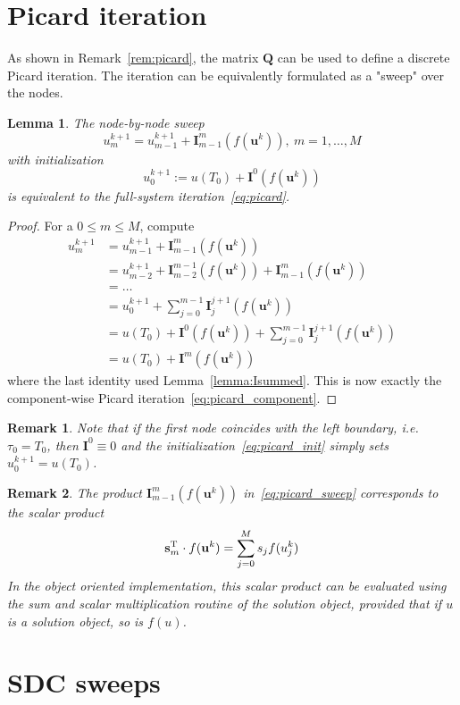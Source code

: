 \documentclass[11pt]{article}
\newcommand{\Tt}[1]{\mathbf{#1}}
\newtheorem{remark}{Remark}
\newtheorem{lemma}{Lemma}
\begin{document}
\section{Picard iteration}
As shown in Remark~\ref{rem:picard}, the matrix $\Tt{Q}$ can be used to define a discrete Picard iteration. The iteration can be equivalently formulated as a "sweep" over the nodes.
\begin{lemma}\label{lemma:node_by_node_picard}
The node-by-node sweep
\begin{equation}
	\label{eq:picard_sweep}
	u^{k+1}_{m} = u^{k+1}_{m-1} + \Tt{I}^{m}_{m-1}(f(\Tt{u}^{k})), \ m=1,\ldots,M
\end{equation}
with initialization
\begin{equation}
	\label{eq:picard_init}
	u^{k+1}_{0} := u(T_0) + \Tt{I}^{0}(f(\Tt{u}^{k}))
\end{equation}
is equivalent to the full-system iteration~\eqref{eq:picard}.
\end{lemma}
\begin{proof}
For a $0 \leq m \leq M$, compute
\begin{align}
	u^{k+1}_{m} &= u^{k+1}_{m-1} + \Tt{I}_{m-1}^{m}(f(\Tt{u}^{k})) \\
			    &= u^{k+1}_{m-2} + \Tt{I}_{m-2}^{m-1}(f(\Tt{u}^{k})) + \Tt{I}_{m-1}^{m}(f(\Tt{u}^{k})) \\
			    &= \ldots \\
			    &= u^{k+1}_{0} + \sum_{j=0}^{m-1} \Tt{I}_{j}^{j+1}(f(\Tt{u}^{k})) \\
			    &= u(T_0) + \Tt{I}^{0}(f(\Tt{u}^{k})) + \sum_{j=0}^{m-1} \Tt{I}_{j}^{j+1}(f(\Tt{u}^{k})) \\
			    &= u(T_0) + \Tt{I}^{m}(f(\Tt{u}^{k}))
\end{align}
where the last identity used Lemma~\ref{lemma:Isummed}. This is now exactly the component-wise Picard iteration~\eqref{eq:picard_component}.
\end{proof}
\begin{remark}
Note that if the first node coincides with the left boundary, i.e. $\tau_0 = T_0$, then $\Tt{I}^{0} \equiv 0$ and the initialization~\eqref{eq:picard_init} simply sets $u^{k+1}_0 = u(T_0)$.
\end{remark}
\begin{remark}
The product $\Tt{I}_{m-1}^{m}(f(\Tt{u}^{k}))$ in~\eqref{eq:picard_sweep} corresponds to the scalar product
\begin{equation}
	\Tt{s}_{m}^{\rm T} \cdot f(\Tt{u}^{k}) = \sum_{j=0}^{M} s_{j} f(u^{k}_{j})
\end{equation}
In the object oriented implementation, this scalar product can be evaluated using the sum and scalar multiplication routine of the solution object, provided that if $u$ is a solution object, so is $f(u)$.
\end{remark}
\section{SDC sweeps}




\end{document}
